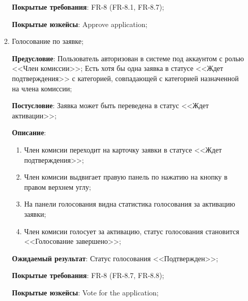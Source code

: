 \begin{enumerate}
\begin{enumerate}
        \textbf{Покрытые требования}: FR-8 (FR-8.1, FR-8.7);
        
        \textbf{Покрытые юзкейсы}: Approve application;
        
        \item Голосование по заявке;
        
        \textbf{Предусловие}: Пользователь авторизован в системе под аккаунтом с ролью <<Член комиссии>>; Есть хотя бы одна заявка в статусе <<Ждет подтверждения>> с категорией, совпадающей с категорией назначенной на члена комиссии;  
        
        \textbf{Постусловие}: Заявка может быть переведена в статус <<Ждет активации>>;
        
        \textbf{Описание}: \begin{enumerate}
        \item Член комисии переходит на карточку заявки в статусе <<Ждет подтверждения>>;
        \item Член комисии выдвигает правую панель по нажатию на кнопку в правом верхнем углу;
        \item На панели голосования видна статистика голосования за активацию заявки;
        \item Член комисии голосует за активацию, статус голосования становится <<Голосование завершено>>;
        \end{enumerate}
        
        \textbf{Ожидаемый результат}: Статус голосования <<Подтвержден>>;
        
        \textbf{Покрытые требования}: FR-8 (FR-8.7, FR-8.8);
        
        \textbf{Покрытые юзкейсы}: Vote for the application;
        
    \end{enumerate}
\end{enumerate}


\renewcommand{\labelenumi}{\arabic{enumi}.}


\renewcommand{\labelenumii}{\arabic{enumii}.}